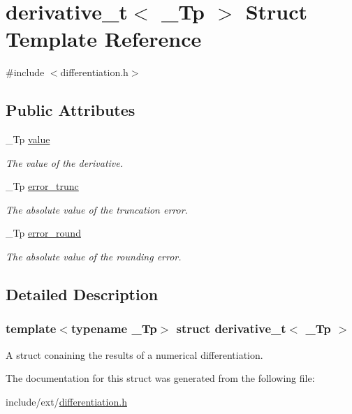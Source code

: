 \hypertarget{structderivative__t}{}\section{derivative\+\_\+t$<$ \+\_\+\+Tp $>$ Struct Template Reference}
\label{structderivative__t}


{\ttfamily \#include $<$differentiation.\+h$>$}

\subsection*{Public Attributes}
\begin{DoxyCompactItemize}
\item 
\mbox{\label{structderivative__t_a80c4b0dfdc6e2dcc8a9802d60dbb73ee}} 
\+\_\+\+Tp \hyperlink{structderivative__t_a80c4b0dfdc6e2dcc8a9802d60dbb73ee}{value}
\begin{DoxyCompactList}\small\item\em The value of the derivative. \end{DoxyCompactList}\item 
\mbox{\label{structderivative__t_ac9a4904da8901950967bdc5e6b1cc012}} 
\+\_\+\+Tp \hyperlink{structderivative__t_ac9a4904da8901950967bdc5e6b1cc012}{error\+\_\+trunc}
\begin{DoxyCompactList}\small\item\em The absolute value of the truncation error. \end{DoxyCompactList}\item 
\mbox{\label{structderivative__t_a423825c0784d7156c5e71075eb6c2103}} 
\+\_\+\+Tp \hyperlink{structderivative__t_a423825c0784d7156c5e71075eb6c2103}{error\+\_\+round}
\begin{DoxyCompactList}\small\item\em The absolute value of the rounding error. \end{DoxyCompactList}\end{DoxyCompactItemize}


\subsection{Detailed Description}
\subsubsection*{template$<$typename \+\_\+\+Tp$>$\newline
struct derivative\+\_\+t$<$ \+\_\+\+Tp $>$}

A struct conaining the results of a numerical differentiation. 

The documentation for this struct was generated from the following file\+:\begin{DoxyCompactItemize}
\item 
include/ext/\hyperlink{differentiation_8h}{differentiation.\+h}\end{DoxyCompactItemize}
